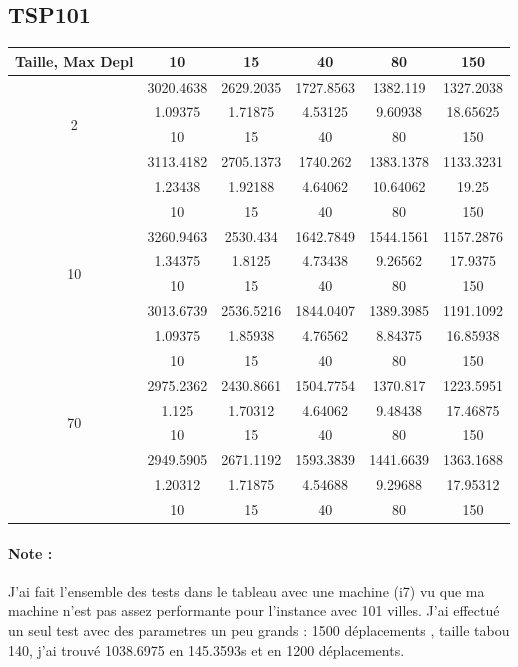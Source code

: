 \documentclass[12pt]{article}
\begin{document}
            \subsection{TSP101}
            \begin{tabular}{|c|c|c|c|c|c|}
                \hline
                {Taille, Max Depl} & 10 & 15 & 40 & 80 & 150 \\ \hline
                \multirow{4}{*}{2} & 3020.4638 & 2629.2035 & 1727.8563 & 1382.119 & 1327.2038  \\ & 1.09375 & 1.71875 & 4.53125 & 9.60938 & 18.65625  \\ & 10 & 15 & 40 & 80 & 150  \\\hline
                \multirow{4}{*}{5} & 3113.4182 & 2705.1373 & 1740.262 & 1383.1378 & 1133.3231  \\ & 1.23438 & 1.92188 & 4.64062 & 10.64062 & 19.25  \\ & 10 & 15 & 40 & 80 & 150  \\\hline
                \multirow{4}{*}{10} & 3260.9463 & 2530.434 & 1642.7849 & 1544.1561 & 1157.2876  \\ & 1.34375 & 1.8125 & 4.73438 & 9.26562 & 17.9375  \\ & 10 & 15 & 40 & 80 & 150  \\\hline
                \multirow{4}{*}{30} & 3013.6739 & 2536.5216 & 1844.0407 & 1389.3985 & 1191.1092  \\ & 1.09375 & 1.85938 & 4.76562 & 8.84375 & 16.85938  \\ & 10 & 15 & 40 & 80 & 150  \\\hline
                \multirow{4}{*}{70} & 2975.2362 & 2430.8661 & 1504.7754 & 1370.817 & 1223.5951  \\ & 1.125 & 1.70312 & 4.64062 & 9.48438 & 17.46875  \\ & 10 & 15 & 40 & 80 & 150  \\\hline
                \multirow{4}{*}{130} & 2949.5905 & 2671.1192 & 1593.3839 & 1441.6639 & 1363.1688  \\ & 1.20312 & 1.71875 & 4.54688 & 9.29688 & 17.95312  \\ & 10 & 15 & 40 & 80 & 150  \\\hline 
            \end{tabular}
            \paragraph{Note :\\}
            J'ai fait l'ensemble des tests dans le tableau avec une machine (i7) vu que ma machine n'est pas assez performante pour l'instance avec 101 villes.
            J'ai effectué un seul test avec des parametres un peu grands : 1500 déplacements , taille tabou 140, j'ai trouvé 1038.6975 en 145.3593s et en 1200 déplacements.   
\end{document}
